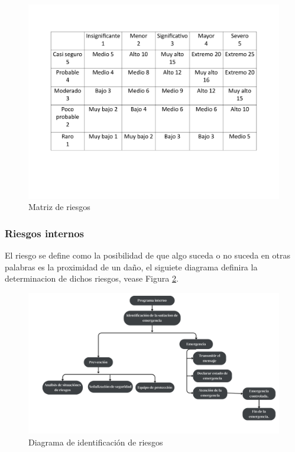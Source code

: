     \begin{figure}[H]
        \centering
        \includegraphics[scale=0.28]{21/img/matriz.pdf}
        \caption{Matriz de riesgos}
        \label{fig:matriz}
    \end{figure}
    
    \subsubsection{Riesgos internos}
    
    El riesgo se define como la posibilidad de que algo suceda o no suceda en otras palabras es la proximidad de un daño, el siguiete diagrama definira la determinacion de dichos riesgos, vease Figura \ref{fig:diagramaIdentificacionRiesgos}. 
    
    \begin{figure}[H]
        \centering
        \includegraphics[scale=0.150]{21/img/diagramaIdentificacionRiesgos.pdf}
        \caption{Diagrama de identificación de riesgos}
        \label{fig:diagramaIdentificacionRiesgos}
    \end{figure}
    
